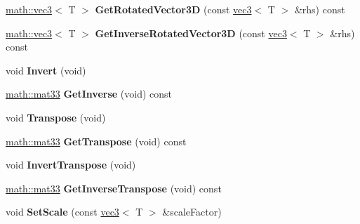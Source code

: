 \begin{DoxyCompactItemize}
\item 
\hypertarget{classmath_1_1mat33_a3390e04503571a1b5e50b5517814f65c}{
\hyperlink{classmath_1_1vec3}{math::vec3}$<$ T $>$ {\bfseries GetRotatedVector3D} (const \hyperlink{classmath_1_1vec3}{vec3}$<$ T $>$ \&rhs) const }
\label{classmath_1_1mat33_a3390e04503571a1b5e50b5517814f65c}

\item 
\hypertarget{classmath_1_1mat33_aafa7b03d0198ac63318db01a7e492ca4}{
\hyperlink{classmath_1_1vec3}{math::vec3}$<$ T $>$ {\bfseries GetInverseRotatedVector3D} (const \hyperlink{classmath_1_1vec3}{vec3}$<$ T $>$ \&rhs) const }
\label{classmath_1_1mat33_aafa7b03d0198ac63318db01a7e492ca4}

\item 
\hypertarget{classmath_1_1mat33_adb76a471993284b321afcf34018597cb}{
void {\bfseries Invert} (void)}
\label{classmath_1_1mat33_adb76a471993284b321afcf34018597cb}

\item 
\hypertarget{classmath_1_1mat33_af16584a9c1c5f7f0f3f75364f2356756}{
\hyperlink{classmath_1_1mat33}{math::mat33} {\bfseries GetInverse} (void) const }
\label{classmath_1_1mat33_af16584a9c1c5f7f0f3f75364f2356756}

\item 
\hypertarget{classmath_1_1mat33_a0fd3a7e4f4d6458cc67570a7f007b3d9}{
void {\bfseries Transpose} (void)}
\label{classmath_1_1mat33_a0fd3a7e4f4d6458cc67570a7f007b3d9}

\item 
\hypertarget{classmath_1_1mat33_a1025261eddde345ca648a079d6be4ed0}{
\hyperlink{classmath_1_1mat33}{math::mat33} {\bfseries GetTranspose} (void) const }
\label{classmath_1_1mat33_a1025261eddde345ca648a079d6be4ed0}

\item 
\hypertarget{classmath_1_1mat33_a818490de753ccec391254bf46500b62d}{
void {\bfseries InvertTranspose} (void)}
\label{classmath_1_1mat33_a818490de753ccec391254bf46500b62d}

\item 
\hypertarget{classmath_1_1mat33_a98aa72afbe839ab1b1fe6518db0ca2bb}{
\hyperlink{classmath_1_1mat33}{math::mat33} {\bfseries GetInverseTranspose} (void) const }
\label{classmath_1_1mat33_a98aa72afbe839ab1b1fe6518db0ca2bb}

\item 
\hypertarget{classmath_1_1mat33_a0284100c7d1b14fbba752d2af0a0d17c}{
void {\bfseries SetScale} (const \hyperlink{classmath_1_1vec3}{vec3}$<$ T $>$ \&scaleFactor)}
\label{classmath_1_1mat33_a0284100c7d1b14fbba752d2af0a0d17c}


\end{DoxyCompactItemize}
